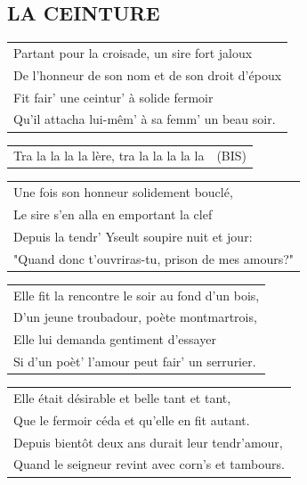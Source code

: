 \documentclass{article}
\begin{document}
\subsection*{LA CEINTURE}
\begin{flushleft}
\begin{tabularx}{0.8\textwidth} {
    >{\raggedright\arraybackslash}X}
Partant pour la croisade, un sire fort jaloux\\
De l’honneur de son nom et de son droit d’époux\\
Fit fair’ une ceintur’ à solide fermoir\\
Qu’il attacha lui-mêm’ à sa femm’ un beau soir.\\
\end{tabularx}
\end{flushleft}
\begin{flushleft}
\begin{tabularx}{0.8\textwidth} {
    >{\raggedright\arraybackslash}X c}
Tra la la la la lère, tra la la la la la & (BIS) \\
\end{tabularx}
\end{flushleft}
\begin{flushleft}
\begin{tabularx}{0.8\textwidth} {
    >{\raggedright\arraybackslash}X}
Une fois son honneur solidement bouclé,\\
Le sire s’en alla en emportant la clef\\
Depuis la tendr’ Yseult soupire nuit et jour:\\
"Quand donc t’ouvriras-tu, prison de mes amours?"\\
\end{tabularx}
\end{flushleft}
\begin{flushleft}
\begin{tabularx}{0.8\textwidth} {
    >{\raggedright\arraybackslash}X}
Elle fit la rencontre le soir au fond d’un bois,\\
D’un jeune troubadour, poète montmartrois,\\
Elle lui demanda gentiment d’essayer\\
Si d’un poèt’ l’amour peut fair’ un serrurier.\\
\end{tabularx}
\end{flushleft}
\begin{flushleft}
\begin{tabularx}{0.8\textwidth} {
    >{\raggedright\arraybackslash}X}
Elle était désirable et belle tant et tant,\\
Que le fermoir céda et qu’elle en fit autant.\\
Depuis bientôt deux ans durait leur tendr’amour,\\
Quand le seigneur revint avec corn’s et tambours.\\
\end{tabularx}
\end{flushleft}
\end{document}
